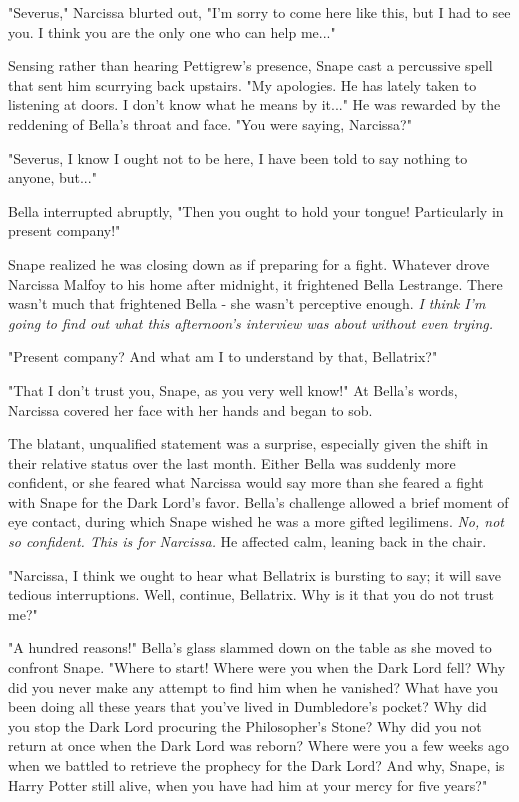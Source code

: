 \documentclass[a4paper,11pt]{article}
\begin{document}
"Severus," Narcissa blurted out, "I'm sorry to come here like this, but I had to see you. I think you are the only one who can help me..."

Sensing rather than hearing Pettigrew's presence, Snape cast a percussive spell that sent him scurrying back upstairs. "My apologies. He has lately taken to listening at doors. I don't know what he means by it..." He was rewarded by the reddening of Bella's throat and face. "You were saying, Narcissa?"

"Severus, I know I ought not to be here, I have been told to say nothing to anyone, but..."

Bella interrupted abruptly, "Then you ought to hold your tongue! Particularly in present company!"

Snape realized he was closing down as if preparing for a fight. Whatever drove Narcissa Malfoy to his home after midnight, it frightened Bella Lestrange. There wasn't much that frightened Bella - she wasn't perceptive enough. \emph{I think I'm going to find out what this afternoon's interview was about without even trying.}

"Present company? And what am I to understand by that, Bellatrix?"

"That I don't trust you, Snape, as you very well know!" At Bella's words, Narcissa covered her face with her hands and began to sob.

The blatant, unqualified statement was a surprise, especially given the shift in their relative status over the last month. Either Bella was suddenly more confident, or she feared what Narcissa would say more than she feared a fight with Snape for the Dark Lord's favor. Bella's challenge allowed a brief moment of eye contact, during which Snape wished he was a more gifted legilimens. \emph{No, not so confident. This is for Narcissa.} He affected calm, leaning back in the chair.

"Narcissa, I think we ought to hear what Bellatrix is bursting to say; it will save tedious interruptions. Well, continue, Bellatrix. Why is it that you do not trust me?"

"A hundred reasons!" Bella's glass slammed down on the table as she moved to confront Snape. "Where to start! Where were you when the Dark Lord fell? Why did you never make any attempt to find him when he vanished? What have you been doing all these years that you've lived in Dumbledore's pocket? Why did you stop the Dark Lord procuring the Philosopher's Stone? Why did you not return at once when the Dark Lord was reborn? Where were you a few weeks ago when we battled to retrieve the prophecy for the Dark Lord? And why, Snape, is Harry Potter still alive, when you have had him at your mercy for five years?"
\end{document}
